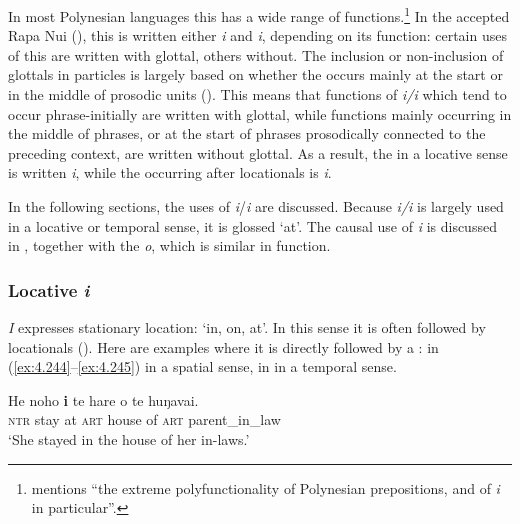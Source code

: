 In most Polynesian languages this  has a wide range of functions.\footnote{\label{fn:229}\citet[428]{Chapin1978} mentions “the extreme polyfunctionality of Polynesian prepositions, and of \textit{i} in particular”.} In the accepted Rapa Nui  (), this  is written either \textit{{\ꞌ}i} and \textit{i}, depending on its function: certain uses of this  are written with glottal, others without. The inclusion or non-inclusion of glottals in particles is largely based on whether the  occurs mainly at the start or in the middle of prosodic units (). This means that functions of \textit{i/{\ꞌ}i} which tend to occur phrase-initially are written with glottal, while functions mainly occurring in the middle of phrases, or at the start of phrases prosodically connected to the preceding context, are written without glottal. As a result, the  in a locative sense is written \textit{{\ꞌ}i}, while the  occurring after locationals is \textit{i}.

In the following sections, the uses of \textit{i}/\textit{{\ꞌ}i} are discussed.  Because \textit{{\ꞌ}i/i} is largely used in a locative or temporal sense, it is glossed ‘at’.
The causal use of \textit{{\ꞌ}i} is discussed in , together with the  \textit{{\ꞌ}o}, which is similar in function.

\subsubsection[Locative {\ꞌ}i]{Locative \textit{{\ꞌ}i}}\label{sec:4.7.2.1}

\textit{{\ꞌ}I} expresses stationary location: ‘in, on, at’. In this sense it is often followed by locationals (). Here are examples where it is directly followed by a : in (\ref{ex:4.244}–\ref{ex:4.245}) in a spatial sense, in  in a temporal sense.

\ea\label{ex:4.244}
\gll He noho \textbf{{\ꞌ}i} te hare o te huŋavai. \\
\textsc{ntr} stay at \textsc{art} house of \textsc{art} parent\_in\_law \\

\glt 
‘She stayed in the house of her in-laws.’ \textstyleExampleref{[Mtx-5-03.002]}
\z

